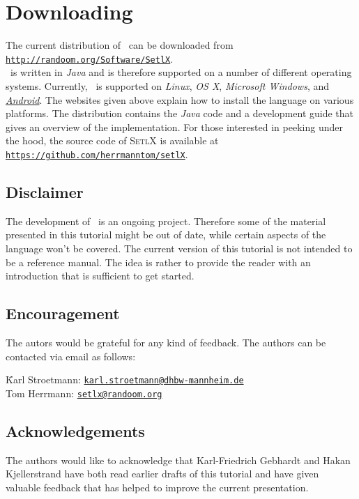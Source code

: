 \section{Downloading}
The current distribution of  \setlx\ can be downloaded from 
\\[0.2cm]
\hspace*{1.3cm}
\href{http://randoom.org/Software/SetlX}{\texttt{http://randoom.org/Software/SetlX}}.
\\[0.2cm]
\setlx\ is
written in \textsl{Java} and is therefore supported on a number of different operating
systems.  Currently, \setlx\ is supported on \textsl{Linux}, \textsl{OS X},
\textsl{Microsoft Windows}, and
\href{https://play.google.com/store/apps/details?id=org.randoom.setlxUI.android}{\textsl{Android}}.   
The websites given above explain how to install the language on various platforms.  
The distribution contains the \textsl{Java} code and a development guide that gives an
overview of the implementation. For those
interested in peeking under the hood, the source code of \textsc{SetlX}
is available at
\\[0.2cm]
\hspace*{1.3cm}
\href{https://github.com/herrmanntom/setlX}{\texttt{https://github.com/herrmanntom/setlX}}.



\subsection*{Disclaimer}
The development of \setlx\ is an ongoing project.  Therefore some of the material presented in
this tutorial might be out of date, while certain aspects of the language won't be
covered.  The current version of this tutorial is not intended to be a reference manual.
The idea is rather to provide the reader with an introduction that is sufficient to get started.

\subsection*{Encouragement}
The autors would be grateful for any kind of feedback.  The authors can be contacted via
email as follows:
\begin{tabbing}
\qquad \= Karl Stroetmann: \qquad \= \href{mailto:karl.stroetmann@dhbw-mannheim.de}{\texttt{karl.stroetmann@dhbw-mannheim.de}} \\[0.2cm]
       \> Tom Herrmann:           \> \href{mailto:setlx@randoom.org}{\texttt{setlx@randoom.org}}
\end{tabbing}

\subsection*{Acknowledgements}
The authors would like to acknowledge that Karl-Friedrich Gebhardt and Hakan Kjellerstrand 
have both  read earlier drafts of
this tutorial and have given valuable feedback that has helped to improve the current
presentation. 

